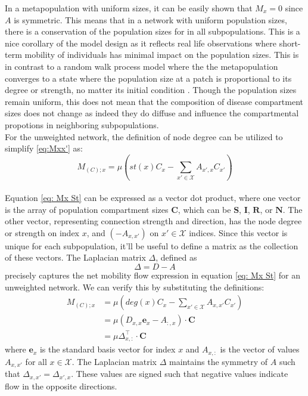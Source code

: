 In a metapopulation with uniform sizes, it can be easily shown that $M_x=0$ since $A$ is symmetric. This means that in a network with uniform population sizes, there is a conservation of the population sizes for in all subpopulations. This is a nice corollary of the model design as it reflects real life observations where short-term mobility of individuals has minimal impact on the population sizes. This is in contrast to a random walk process model where the the metapopulation converges to a state where the population size at a patch is proportional to its degree or strength, no matter its initial condition \cite{colizza2008epidemic}. Though the population sizes remain uniform, this does not mean that the composition of disease compartment sizes does not change as indeed they do diffuse and influence the compartmental propotions in neighboring subpopulations.
\\
For the unweighted network, the definition of node degree can be utilized to simplify \ref{eq:Mxx'} as:
\begin{equation}
    M_{(C);x} = \mu \left( st(x) C_x - \sum_{x' \in \mathcal{X}} A_{x',x} C_{x'} \right)
    \label{eq: Mx St}
\end{equation}
\\
Equation \ref{eq: Mx St} can be expressed as a vector dot product, where one vector is the array of population compartment sizes $\mathbf{C}$, which can be $\mathbf{S}$, $\mathbf{I}$, $\mathbf{R}$, or $\mathbf{N}$. The other vector, representing connection strength and direction, has the node degree or strength on index $x$, and $(-A_{x,x'})$ on $x'\in \mathcal{X}$ indices. Since this vector is unique for each subpopulation, it'll be useful to define a matrix as the collection of these vectors. The Laplacian matrix $\Delta$, defined as 
\begin{equation}
    \Delta = D - A
    \label{eq: Delta}
\end{equation}
 precisely captures the net mobility flow expression in equation \ref{eq: Mx St} for an unweighted network. We can verify this by substituting the definitions:
\begin{equation}
    \begin{aligned}
        M_{(C);x} &= \mu \left( deg(x)C_x - \sum_{x' \in \mathcal{X}} A_{x,x'}C_{x'} \right) \\
        &= \mu \left( D_{x,x} \mathbf{e}_x - A_{:,x} \right) \cdot \mathbf{C} \\
        &= \mu \Delta_{x,:}^{\top} \cdot \mathbf{C}
    \end{aligned}
\end{equation}
where $\mathbf{e}_x$ is the standard basis vector for index $x$ and $A_{x,:}$ is the vector of values $A_{x,x'}$ for all $x \in \mathcal{X}$. The Laplacian matrix $\Delta$ maintains the symmetry of $A$ such that $\Delta_{x,x'} = \Delta_{x',x}$. These values are signed such that negative values indicate flow in the opposite directions.
\\


